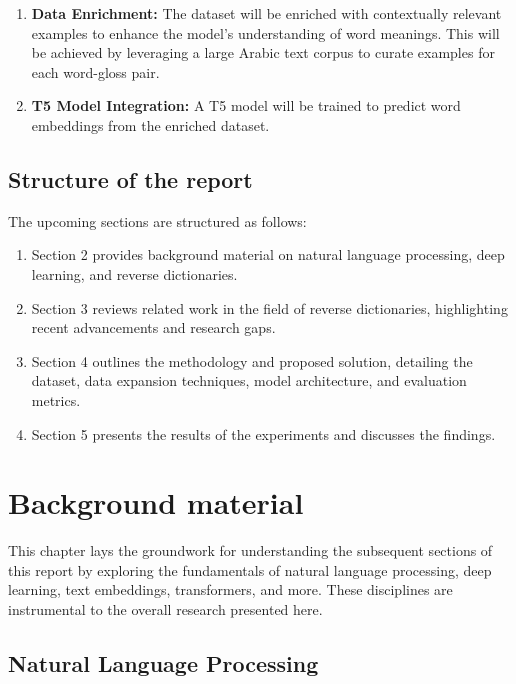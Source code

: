 \documentclass[12.5pt]{article}
\begin{document}
\begin{enumerate}
    \item \textbf{Data Enrichment:} The dataset will be enriched with contextually relevant examples to enhance the model's understanding of word meanings. This will be achieved by leveraging a large Arabic text corpus to curate examples for each word-gloss pair.
    \item \textbf{T5 Model Integration:} A T5 model will be trained to predict word embeddings from the enriched dataset.
\end{enumerate}

\newpage

\subsection{Structure of the report}

The upcoming sections are structured as follows:

\begin{enumerate}
    \item Section 2 provides background material on natural language processing, deep learning, and reverse dictionaries.
    \item Section 3 reviews related work in the field of reverse dictionaries, highlighting recent advancements and research gaps.
    \item Section 4 outlines the methodology and proposed solution, detailing the dataset, data expansion techniques, model architecture, and evaluation metrics.
    \item Section 5 presents the results of the experiments and discusses the findings.
\end{enumerate}

\newpage

\section{Background material}

This chapter lays the groundwork for understanding the subsequent sections of this report by exploring the fundamentals of natural language processing, deep learning, text embeddings, transformers, and more. These disciplines are instrumental to the overall research presented here.

\subsection{Natural Language Processing}
\end{document}
